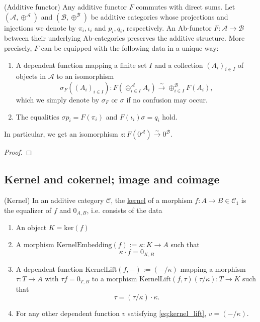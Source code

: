 \begin{lemma}{(Additive functor)}
Any additive functor $F$ commutes with direct sums.
Let $( \mathcal{A},\oplus^{\mathcal{A}} )$ and $( \mathcal{B}, \oplus^{\mathcal{B}} )$ be additive categories whose projections and injections
we denote by $\pi_{i}, \iota_{i}$ and $p_{i}, q_{i}$, respectively. An Ab-functor $F : \mathcal{A} \rightarrow \mathcal{B}$ between their underlying
Ab-categories preserves the additive structure. More precisely, $F$ can be equipped with the following data in a unique way:
\begin{enumerate}
\item A dependent function mapping a finite set $I$ and a collection $(A_{i})_{i\in I}$ of objects in $\mathcal{A}$ to an isomorphism
\[
\sigma_{F}( (A_{i})_{i\in I}) : F( \oplus_{i\in I}^{\mathcal{A}} A_{i} ) \xrightarrow{\sim} \oplus_{i\in I}^{\mathcal{B}} F( A_{i} ),
\]
which we simply denote by $\sigma_{F}$ or $\sigma$ if no confusion may occur.
\item The equalities $\sigma p_{i} = F(\pi_{i})$ and $F(\iota_{i}) \sigma = q_{i}$ hold.
\end{enumerate}
In particular, we get an isomorphism $z : F( 0^{\mathcal{A}} ) \xrightarrow{\sim} 0^{\mathcal{B}}$.
\end{lemma}
\begin{proof}

\end{proof}

\subsection{Kernel and cokernel; image and coimage}

\begin{definition}{(Kernel)}
In an additive category $\mathcal{C}$, the \ul{kernel} of a morphism $f : A \rightarrow B \in \mathcal{C}_{1}$ is the equalizer of $f$ and $0_{A,B}$,
i.e. consists of the data
\begin{enumerate}
\renewcommand{\labelenumi}{(\theenumi)}
\item An object $K = \mathrm{ker}(f)$
\item A morphism $\mathrm{KernelEmbedding}(f) := \kappa : K \rightarrow A$ such that
\[
\kappa \cdot f = 0_{K,B}
\]
\item A dependent function $\mathrm{KernelLift}(f,-) := ( - /\kappa)$ mapping a morphism $\tau : T \rightarrow A$ with $\tau f = 0_{T,B}$ to a
morphism $\mathrm{KernelLift}(f,\tau) (\tau / \kappa) : T \rightarrow K$ such that
\[
\tau =\label{eq:kernel_lift} (\tau / \kappa) \cdot \kappa.
\]
\item For any other dependent function $v$ satisfying \eqref{eq:kernel_lift}, $v = ( - / \kappa)$.
\end{enumerate}
\end{definition}

